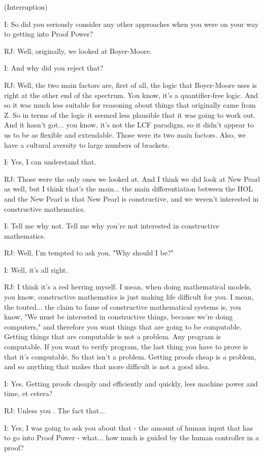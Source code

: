 \documentclass[10pt,titlepage]{book}
\begin{document}
(Interruption)

I: So did you seriously consider any other approaches when you were on your way to getting into Proof Power?

RJ: Well, originally, we looked at Boyer-Moore.

I: And why did you reject that?

RJ: Well, the two main factors are, first of all, the logic that Boyer-Moore uses is right at the other end of the spectrum. You know, it's a quantifier-free 	logic. And so it was much less suitable for reasoning about things that originally came from Z. So in terms of the logic it seemed less plausible that it was going to work out. And it hasn't got... you know, it's not the LCF paradigm, so it didn't appear to us to be as flexible and extendable. Those were its two main factors. Also, we have a cultural aversity to large numbers of brackets.

I: Yes, I can understand that.

RJ: Those were the only ones we looked at. And I think we did look at New Pearl as well, but I think that's the main... the main differentiation between the HOL and the New Pearl is that New Pearl is constructive, and we weren't interested in constructive mathematics.

I: Tell me why not. Tell me why you're not interested in constructive mathematics.

RJ: Well, I'm tempted to ask you, "Why should I be?"

I: Well, it's all right.

RJ: I think it's a red herring myself. I mean, when doing mathematical models, you know, constructive mathematics is just making life difficult for you. I mean, the touted... the claim to fame of constructive mathematical systems is, you know, "We must be interested in constructive things, because we're doing computers," and therefore you want things that are going to be computable. Getting things that are computable is not a problem. Any program is computable. If you want to verify program, the last thing you have to prove is that it's computable. So that isn't a problem. Getting proofs cheap is a problem, and so anything that makes that more difficult is not a good idea.

I: Yes. Getting proofs cheaply and efficiently and quickly, less machine power and time, et cetera?

RJ: Unless you	. The fact that...

I: Yes, I was going to ask you about that - the amount of human input that has to go into Proof Power - what... how much is guided by the human controller in a proof?
\end{document}
